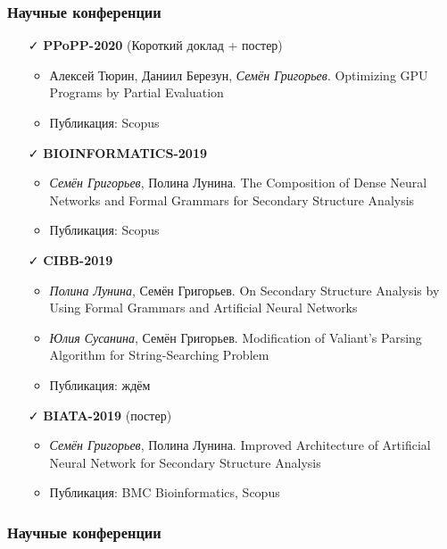 \documentclass[xcolor=table]{beamer}
\begin{document}
\begin{frame}[fragile]

  \frametitle{Научные конференции}
      \begin{itemize}

      \item[\faCheck] \textbf{PPoPP-2020} (Короткий доклад + постер)
      \begin{itemize}
        \item Алексей Тюрин, Даниил Березун, \emph{Семён Григорьев}. Optimizing GPU Programs by Partial Evaluation
        \item Публикация: Scopus
      \end{itemize}


      \item[\faCheck] \textbf{BIOINFORMATICS-2019}
      \begin{itemize}
        \item \emph{Семён Григорьев}, Полина Лунина. The Composition of Dense Neural Networks and Formal Grammars for Secondary Structure Analysis
        \item Публикация: Scopus
      \end{itemize}

      \item[\faCheck] \textbf{CIBB-2019}
      \begin{itemize}
        \item \emph{Полина Лунина}, Семён Григорьев. On Secondary Structure Analysis by Using Formal Grammars and Artificial Neural Networks
        \item \emph{Юлия Сусанина}, Семён Григорьев. Modification of Valiant’s Parsing Algorithm for String-Searching Problem
        \item Публикация: ждём
      \end{itemize}

      \item[\faCheck] \textbf{BIATA-2019} (постер)
      \begin{itemize}
         \item \emph{Семён Григорьев}, Полина Лунина. Improved Architecture of Artificial Neural Network for Secondary Structure Analysis
         \item Публикация: BMC Bioinformatics, Scopus
      \end{itemize}

\end{itemize}
\end{frame}

\begin{frame}[fragile]

  \frametitle{Научные конференции}
\begin{itemize}

      \item[\faHourglassHalf] 

      \item[\faHourglassHalf] 

    \end{itemize}
    \end{frame}
\end{document}
